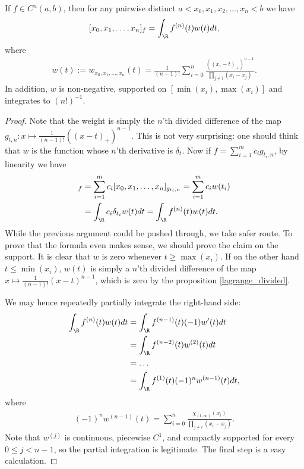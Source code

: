 \begin{lause}\label{peano_theorem}
	If $f \in C^{n}(a, b)$, then for any pairwise distinct $a < x_{0}, x_{1}, x_{2}, \ldots, x_{n} < b$ we have
	\begin{align}\label{peano_identity}
		[x_{0}, x_{1}, \ldots, x_{n}]_{f} = \int_{\R} f^{(n)}(t) w(t) dt,
	\end{align}
	where
	\begin{align}\label{peano_weight}
		w(t) := w_{x_{0}, x_{1}, \ldots, x_{n}}(t) = \frac{1}{(n - 1)!}\sum_{i = 0}^{n} \frac{((x_{i} - t)_{+})^{n - 1}}{\prod_{j \neq i} (x_{i} - x_{j})}.
	\end{align}
	In addition, $w$ is non-negative, supported on $[\min(x_{i}), \max(x_{i})]$ and integrates to $(n!)^{-1}$.
\end{lause}
\begin{proof}
	Note that the weight is simply the $n$'th divided difference of the map $g_{t, n} : x \mapsto \frac{1}{(n - 1)!}((x - t)_{+})^{n - 1}$. This is not very surprising: one should think that $w$ is the function whose $n$'th derivative is $\delta_{t}$. Now if $f = \sum_{i = 1}^{m} c_{i} g_{t_{i}, n}$, by linearity we have
	\begin{align*}
		[x_{0}, x_{1}, \ldots, x_{n}]_{f} &=\sum_{i = 1}^{m} c_{i} [x_{0}, x_{1}, \ldots, x_{n}]_{g_{t_{i}, n}} =\sum_{i = 1}^{m} c_{i} w(t_{i}) \\
		&=\int_{\R} c_{i} \delta_{t_{i}} w(t) dt =\int_{\R} f^{(n)}(t) w(t) dt.
	\end{align*}
	While the previous argument could be pushed through, we take safer route. To prove that the formula even makes sense, we should prove the claim on the support. It is clear that $w$ is zero whenever $t \geq \max(x_{i})$. If on the other hand $t \leq \min(x_{i})$, $w(t)$ is simply a $n$'th divided difference of the map $x \mapsto \frac{1}{(n - 1)!}(x - t)^{n - 1}$, which is zero by the proposition \ref{lagrange_divided}.

	We may hence repeatedly partially integrate the right-hand side:
	\begin{align*}
		 \int_{\R} f^{(n)}(t) w(t) dt &= \int_{\R} f^{(n - 1)}(t) (-1) w'(t) dt \\
		 &= \int_{\R} f^{(n - 2)}(t) w^{(2)}(t) dt \\
		 &= \ldots \\
		 &= \int_{\R} f^{(1)}(t) (-1)^{n} w^{(n - 1)}(t) dt,
	\end{align*}
	where
	\begin{align*}
		(-1)^{n} w^{(n - 1)}(t) = \sum_{i = 0}^{n} \frac{\chi_{(t, \infty)}(x_{i})}{\prod_{j \neq i} (x_{i} - x_{j})}.
	\end{align*}
	Note that $w^{(j)}$ is continuous, piecewise $C^{1}$, and compactly supported for every $0 \leq j < n - 1$, so the partial integration is legitimate. The final step is a easy calculation.


\end{proof}
